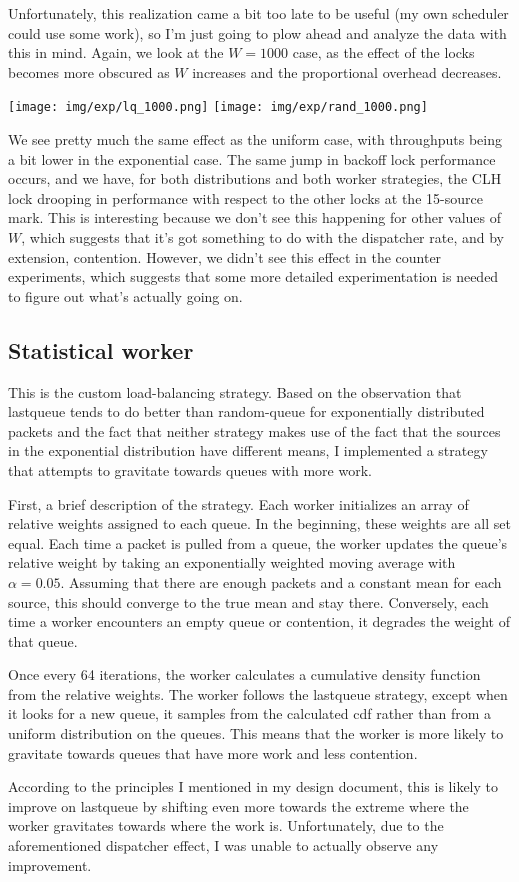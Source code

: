 \documentclass{article}
\begin{document}
Unfortunately, this realization came a bit too late to be useful (my own scheduler could use some work), so I'm just going to plow ahead and analyze the data with this in mind. Again, we look at the $W=1000$ case, as the effect of the locks becomes more obscured as $W$ increases and the proportional overhead decreases.

\texttt{[image: img/exp/lq\_1000.png]}
\texttt{[image: img/exp/rand\_1000.png]}

We see pretty much the same effect as the uniform case, with throughputs being a bit lower in the exponential case. The same jump in backoff lock performance occurs, and we have, for both distributions and both worker strategies, the CLH lock drooping in performance with respect to the other locks at the 15-source mark. This is interesting because we don't see this happening for other values of $W$, which suggests that it's got something to do with the dispatcher rate, and by extension, contention. However, we didn't see this effect in the counter experiments, which suggests that some more detailed experimentation is needed to figure out what's actually going on.
\subsection*{Statistical worker}
This is the custom load-balancing strategy. Based on the observation that lastqueue tends to do better than random-queue for exponentially distributed packets and the fact that neither strategy makes use of the fact that the sources in the exponential distribution have different means, I implemented a strategy that attempts to gravitate towards queues with more work.

First, a brief description of the strategy. Each worker initializes an array of relative weights assigned to each queue. In the beginning, these weights are all set equal. Each time a packet is pulled from a queue, the worker updates the queue's relative weight by taking an exponentially weighted moving average with $\alpha=0.05$. Assuming that there are enough packets and a constant mean for each source, this should converge to the true mean and stay there. Conversely, each time a worker encounters an empty queue or contention, it degrades the weight of that queue.

Once every 64 iterations, the worker calculates a cumulative density function from the relative weights. The worker follows the lastqueue strategy, except when it looks for a new queue, it samples from the calculated cdf rather than from a uniform distribution on the queues. This means that the worker is more likely to gravitate towards queues that have more work and less contention. 

According to the principles I mentioned in my design document, this is likely to improve on lastqueue by shifting even more towards the extreme where the worker gravitates towards where the work is. Unfortunately, due to the aforementioned dispatcher effect, I was unable to actually observe any improvement.
\end{document}
